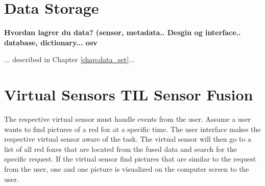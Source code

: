 \documentclass[USenglish]{uit-thesis}
\begin{document}
\section{Data Storage} \label{ssec:des_fused}

\textbf{Hvordan lagrer du data? (sensor, metadata.. Desgin og interface.. database, dictionary... osv}

... described in Chapter \ref{chap:data_set}...



\section{Virtual Sensors TIL Sensor Fusion}
The respective virtual sensor must handle events from the user. Assume a user wants to find pictures of a red fox at a specific time.  The user interface makes the respective virtual sensor aware of the task. The virtual sensor will then go to a list of all red foxes that are located from the fused data and search for the specific request. If the virtual sensor find pictures that are similar to the request from the user, one and one picture is visualized on the computer screen to the user.
\end{document}
